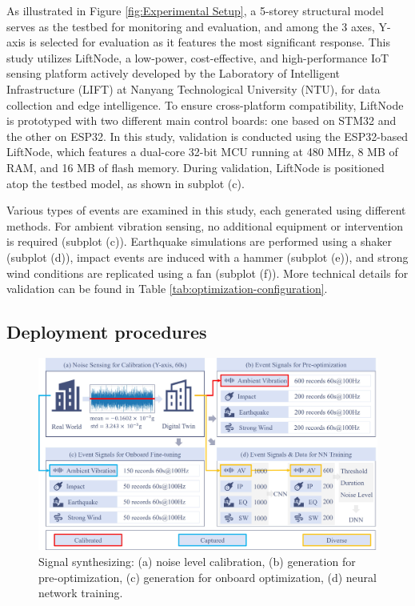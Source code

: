 \documentclass[a4paper,fleqn,numbers,sort&compress]{cas-sc}
\begin{document}
As illustrated in Figure \ref{fig:Experimental Setup}, a 5-storey structural model serves as the testbed for monitoring and evaluation, and among the 3 axes, Y-axis is selected for evaluation as it features the most significant response. This study utilizes LiftNode, a low-power, cost-effective, and high-performance IoT sensing platform actively developed by the Laboratory of Intelligent Infrastructure (LIFT) at Nanyang Technological University (NTU), for data collection and edge intelligence. To ensure cross-platform compatibility, LiftNode is prototyped with two different main control boards: one based on STM32 and the other on ESP32. In this study, validation is conducted using the ESP32-based LiftNode, which features a dual-core 32-bit MCU running at 480 MHz, 8 MB of RAM, and 16 MB of flash memory. During validation, LiftNode is positioned atop the testbed model, as shown in subplot (c).

Various types of events are examined in this study, each generated using different methods. For ambient vibration sensing, no additional equipment or intervention is required (subplot (c)). Earthquake simulations are performed using a shaker (subplot (d)), impact events are induced with a hammer (subplot (e)), and strong wind conditions are replicated using a fan (subplot (f)). More technical details for validation can be found in Table \ref{tab:optimization-configuration}.

\subsection{Deployment procedures}

\begin{figure}[htbp]
    \centering
    \includegraphics[width=0.9\linewidth]{Fig10.jpg}
    \caption{Signal synthesizing: (a) noise level calibration, (b) generation for pre-optimization, (c) generation for onboard optimization, (d) neural network training.}
    \label{fig:Signal Synthesizing}
\end{figure}
\end{document}
